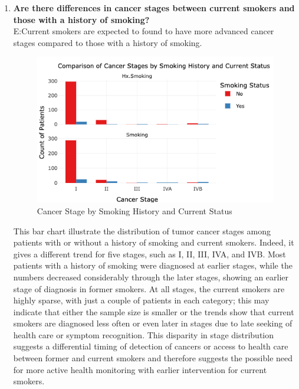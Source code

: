 \documentclass[12pt]{article}
\begin{document}
\begin{enumerate}
   \item \textbf{Are there differences in cancer stages between current smokers and those with a history of smoking? } \\
   E:Current smokers are expected to found to have more advanced cancer stages compared to those with a history of smoking.

 \begin{figure}[h]
        \vspace{5pt}
        \centering
        \includegraphics[width=1.1\textwidth]{smoking all.png}  
        \caption{Cancer Stage by Smoking History and Current Status}
            \label{fig:example}
       \vspace{0.5cm}
    \end{figure}

This bar chart illustrate the distribution of tumor cancer stages among patients with or without a history of smoking and current smokers. Indeed, it gives a different trend for five stages, such as I, II, III, IVA, and IVB. Most patients with a history of smoking were diagnosed at earlier stages, while the numbers decreased considerably through the later stages, showing an earlier stage of diagnosis in former smokers. At all stages, the current smokers are highly sparse, with just a couple of patients in each category; this may indicate that either the sample size is smaller or the trends show that current smokers are diagnosed less often or even later in stages due to late seeking of health care or symptom recognition. This disparity in stage distribution suggests a differential timing of detection of cancers or access to health care between former and current smokers and therefore suggests the possible need for more active health monitoring with earlier intervention for current smokers.
\newpage



\end{enumerate}
\end{document}
